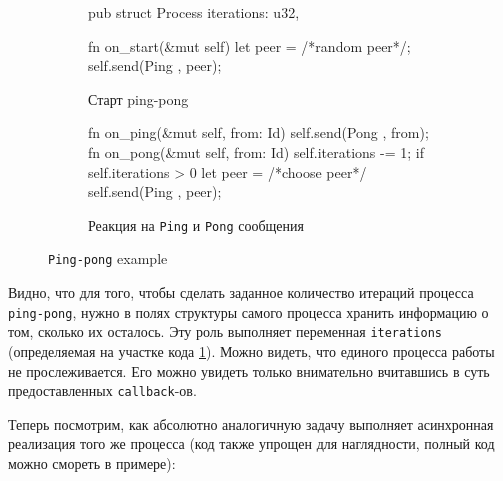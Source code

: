 \begin{figure}[H]
    \centering
    \begin{subfigure}[b]{0.40\linewidth}
        \footnotesize
        \centering
        \begin{rustcode}
pub struct Process {
  iterations: u32,
}

fn on_start(&mut self) {
  let peer = /*random peer*/;
  self.send(Ping {}, peer);
}
    \end{rustcode}
        \caption{Старт ping-pong}
        \label{start-ping-pong}
    \end{subfigure}
    \hfill
    \begin{subfigure}[b]{0.51\linewidth}
        \footnotesize
        \centering
        \begin{rustcode}
fn on_ping(&mut self, from: Id) {
  self.send(Pong {}, from);
}        
fn on_pong(&mut self, from: Id) {
  self.iterations -= 1;
  if self.iterations > 0 {
    let peer = /*choose peer*/
    self.send(Ping {}, peer);
  }
}
    \end{rustcode}
        \caption{Реакция на \texttt{Ping} и \texttt{Pong} сообщения}
        \label{ping-pong-on-pong}
    \end{subfigure}
\caption{\texttt{Ping-pong} example}
\label{ping-pong-code}
\end{figure}

Видно, что для того, чтобы сделать заданное количество итераций процесса \texttt{ping-pong}, нужно в полях структуры самого процесса хранить информацию о том, сколько их осталось. Эту роль выполняет переменная \texttt{iterations} (определяемая на участке кода \ref{start-ping-pong}). Можно видеть, что единого процесса работы не прослеживается. Его можно увидеть только внимательно вчитавшись в суть предоставленных \texttt{callback}-ов.

Теперь посмотрим, как абсолютно аналогичную задачу выполняет асинхронная реализация того же процесса (код также упрощен для наглядности, полный код можно смореть в примере\cite{async-ping-pong-example}): 

